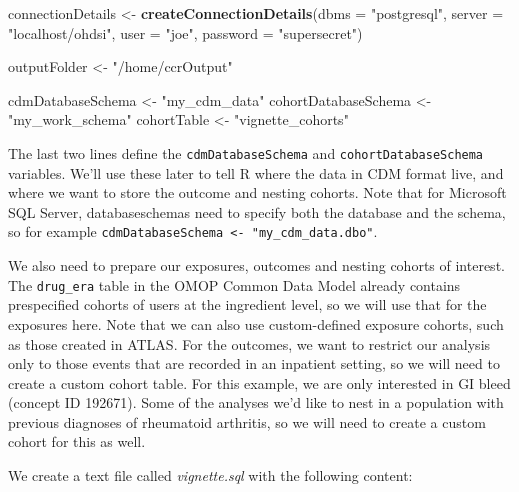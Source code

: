 \documentclass[]{article}
\newenvironment{Shaded}{\begin{snugshade}}{\end{snugshade}}
\newcommand{\DataTypeTok}[1]{\textcolor[rgb]{0.13,0.29,0.53}{#1}}
\newcommand{\KeywordTok}[1]{\textcolor[rgb]{0.13,0.29,0.53}{\textbf{#1}}}
\newcommand{\NormalTok}[1]{#1}
\newcommand{\StringTok}[1]{\textcolor[rgb]{0.31,0.60,0.02}{#1}}
\begin{document}
\begin{Shaded}
\begin{Highlighting}[]
\NormalTok{connectionDetails <-}\StringTok{ }\KeywordTok{createConnectionDetails}\NormalTok{(}\DataTypeTok{dbms =} \StringTok{"postgresql"}\NormalTok{, }
                                             \DataTypeTok{server =} \StringTok{"localhost/ohdsi"}\NormalTok{, }
                                             \DataTypeTok{user =} \StringTok{"joe"}\NormalTok{, }
                                             \DataTypeTok{password =} \StringTok{"supersecret"}\NormalTok{)}

\NormalTok{outputFolder <-}\StringTok{ "/home/ccrOutput"}

\NormalTok{cdmDatabaseSchema <-}\StringTok{ "my_cdm_data"}
\NormalTok{cohortDatabaseSchema <-}\StringTok{ "my_work_schema"}
\NormalTok{cohortTable <-}\StringTok{ "vignette_cohorts"}
\end{Highlighting}
\end{Shaded}

The last two lines define the \texttt{cdmDatabaseSchema} and
\texttt{cohortDatabaseSchema} variables. We'll use these later to tell R
where the data in CDM format live, and where we want to store the
outcome and nesting cohorts. Note that for Microsoft SQL Server,
databaseschemas need to specify both the database and the schema, so for
example \texttt{cdmDatabaseSchema\ \textless{}-\ "my\_cdm\_data.dbo"}.

We also need to prepare our exposures, outcomes and nesting cohorts of
interest. The \texttt{drug\_era} table in the OMOP Common Data Model
already contains prespecified cohorts of users at the ingredient level,
so we will use that for the exposures here. Note that we can also use
custom-defined exposure cohorts, such as those created in ATLAS. For the
outcomes, we want to restrict our analysis only to those events that are
recorded in an inpatient setting, so we will need to create a custom
cohort table. For this example, we are only interested in GI bleed
(concept ID 192671). Some of the analyses we'd like to nest in a
population with previous diagnoses of rheumatoid arthritis, so we will
need to create a custom cohort for this as well.

We create a text file called \emph{vignette.sql} with the following
content:
\end{document}
